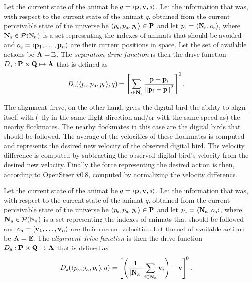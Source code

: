 \begin{defn}
\label{def:animat:Ds:cwr}
Let the current state of the animat be $q=\langle{\ensuremath{\mathbf{p}}},{\mathbf{v}},s\rangle$. Let the information that was, with respect to the current state of the animat $q$, obtained from the current perceivable state of the universe be $\langle p_\mathrm{s},p_\mathrm{a},p_\mathrm{c}\rangle \in {\ensuremath{\mathbf{P}}}$ and let $p_\mathrm{s}=\langle{\ensuremath{\mathbf{N}}}_\mathrm{s},o_\mathrm{s}\rangle$, where ${\mathbf{N}}_\mathrm{s} \in {\ensuremath{\mathcal{P}(\mathbb{N}_n)}}$ is a set representing the indexes of animats that should be avoided and $o_\mathrm{s}=\langle{\ensuremath{\mathbf{p}}}_1,\ldots,{\mathbf{p}}_n\rangle$ are their current positions in space. Let the set of available actions be ${\mathbf{A}}=\mathbb{E}$. The \emph{separation drive function} is then the drive function $D_\mathrm{s}: {\mathbf{P}} \times {\ensuremath{\mathbf{Q}}} \mapsto {\ensuremath{\mathbf{A}}}$ that is defined as 
\begin{equation}
D_\mathrm{s}(\langle p_\mathrm{s},p_\mathrm{a},p_\mathrm{c}\rangle, q) = \left[ \sum_{i \in {\ensuremath{\mathbf{N}}}_\mathrm{s}} \frac{{\mathbf{p}}-{\mathbf{p}}_i}{{\left\|{\mathbf{p}}_i-{\mathbf{p}}\right\|}^2} \right]^0. \label{eq:animat:Ds:cwr}
\end{equation}
\end{defn}

The alignment drive, on the other hand, gives the digital bird the ability to align itself with (\ie\ fly in the same flight direction and/or with the same speed as) the nearby flockmates. The nearby flockmates in this case are the digital birds that should be followed. The average of the velocities of these flockmates is computed and represents the desired new velocity of the observed digital bird. The velocity difference is computed by subtracting the observed digital bird's velocity from the desired new velocity. Finally the force representing the desired action is then, according to OpenSteer v0.8, computed by normalizing the velocity difference.

\begin{defn}
\label{def:animat:Da:cwr}
Let the current state of the animat be $q=\langle{\ensuremath{\mathbf{p}}},{\mathbf{v}},s\rangle$. Let the information that was, with respect to the current state of the animat $q$, obtained from the current perceivable state of the universe be $\langle p_\mathrm{s},p_\mathrm{a},p_\mathrm{c}\rangle \in {\ensuremath{\mathbf{P}}}$ and let $p_\mathrm{a}=\langle{\ensuremath{\mathbf{N}}}_\mathrm{a},o_\mathrm{a}\rangle$, where ${\mathbf{N}}_\mathrm{a} \in {\ensuremath{\mathcal{P}(\mathbb{N}_n)}}$ is a set representing the indexes of animats that should be followed and $o_\mathrm{a}=\langle{\ensuremath{\mathbf{v}}}_1,\ldots,{\mathbf{v}}_n\rangle$ are their current velocities. Let the set of available actions be ${\mathbf{A}}=\mathbb{E}$. The \emph{alignment drive function} is then the drive function $D_\mathrm{a}: {\mathbf{P}} \times {\ensuremath{\mathbf{Q}}} \mapsto {\ensuremath{\mathbf{A}}}$ that is defined as 
\begin{equation}
D_\mathrm{a}(\langle p_\mathrm{s},p_\mathrm{a},p_\mathrm{c}\rangle, q) = \left[ \Biggl( \frac{1}{\left|{\mathbf{N}}_\mathrm{a}\right|} \sum_{i \in {\ensuremath{\mathbf{N}}}_\mathrm{a}} {\mathbf{v}}_i \Biggr) - {\mathbf{v}} \right]^0. \label{eq:animat:Da:cwr}
\end{equation}
\end{defn}

